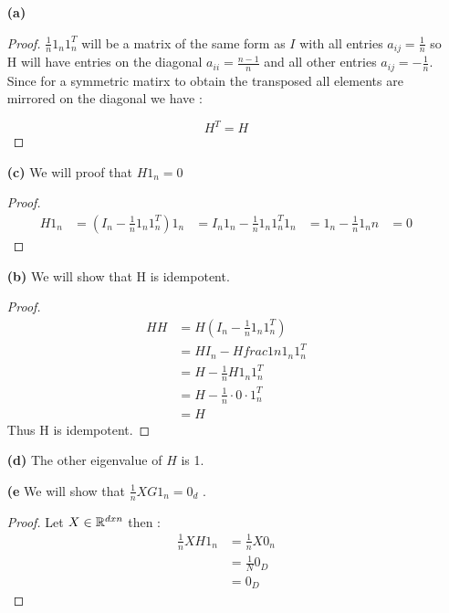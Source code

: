 
\begin{itemize}
    \item[\textbf{(a)}]
    \begin{proof}
        $\frac{1}{n}1_n1_n^T$ will be a matrix of the same form as $I$ with all entries $a_{ij}=\frac{1}{n}$ so H will have entries on the diagonal $a_{ii}=\frac{n-1}{n}$ and all other entries $a_{ij}=-\frac{1}{n}$.
        Since for a symmetric matirx to obtain the transposed all elements are mirrored on the diagonal we have :

        \[
        H^T=H    
        \]
    \end{proof} 
    \item[\textbf{(c)}] 
    We will proof that $H1_n= 0$
    \begin{proof}
        \begin{align*}
            H1_n    &=(I_n-\frac{1}{n}1_n1_n^T)1_n
                    &= I_n1_n -\frac{1}{n}1_n1_n^T1_n
                    &=1_n-\frac{1}{n}1_nn
                    &= 0
        \end{align*}
    \end{proof} 
    \item[\textbf{(b)}]
    We will show that H is idempotent.
    \begin{proof}
        \begin{align*}
            HH  &=H (I_n-\frac{1}{n}1_n1_n^T)\\
                &=HI_n -Hfrac{1}{n}1_n1_n^T\\
                &=H -\frac{1}{n}H1_n1_n^T\\
                &=H - \frac{1}{n}\cdot0\cdot 1_n^T\\
                &= H
        \end{align*}
        Thus H is idempotent.
    \end{proof} 
    \item[\textbf{(d)}] The other eigenvalue of $H$ is 1.
    \item[\textbf{(e}]We will show that $\frac{1}{n}XG1_n=0_d$ .
    \begin{proof}
        Let $X \in \mathbb{R}^{dxn}$ then :
        \begin{align*}
            \frac{1}{n}XH1_n &= \frac{1}{n}X0_n\\
                            &=\frac{1}{N}0_D\\
                            &= 0_D
        \end{align*}
    \end{proof} 
\end{itemize}
